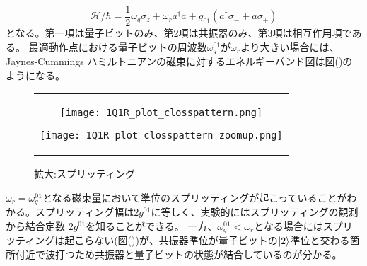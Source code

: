         \begin{equation}
            \mathcal{H} / \hbar=\frac{1}{2} \omega_{q} \sigma_{z}+\omega_{r} a^{\dagger} a+g_{01}\left(a^{\dagger} \sigma_{-}+a \sigma_{+}\right)
        \end{equation}
        となる。第一項は量子ビットのみ、第2項は共振器のみ、第3項は相互作用項である。
        最適動作点における量子ビットの周波数$\omega_q^{01}$が$\omega_r$より大きい場合には、Jaynes-Cummings ハミルトニアンの磁束に対するエネルギーバンド図は図()のようになる。
        \begin{figure}[H]
            \begin{center}
                \begin{tabular}{c}
                    \begin{minipage}{0.5\hsize}
                        \begin{center}
                            \texttt{[image: 1Q1R\_plot\_closspattern.png]}
                        \end{center}
                        \caption{$\omega_r<\omega_q^{01}$の場合の準位図}
                    \end{minipage}
                    
                    \begin{minipage}{0.5\hsize}
                        \begin{center}
                            \texttt{[image: 1Q1R\_plot\_closspattern\_zoomup.png]}
                        \end{center}
                        \caption{拡大:スプリッティング}
                    \end{minipage}
                \end{tabular}
            \end{center}
        \end{figure}
        $\omega_r=\omega_q^{01}$となる磁束量において準位のスプリッティングが起こっていることがわかる。スプリッティング幅は$2g^{01}$に等しく、実験的にはスプリッティングの観測から結合定数 $2g^{01}$を知ることができる。
        一方、$\omega_q^{01}<\omega_r$となる場合にはスプリッティングは起こらない(図())が、共振器準位が量子ビットの$\ket{2}$準位と交わる箇所付近で波打つため共振器と量子ビットの状態が結合しているのが分かる。
